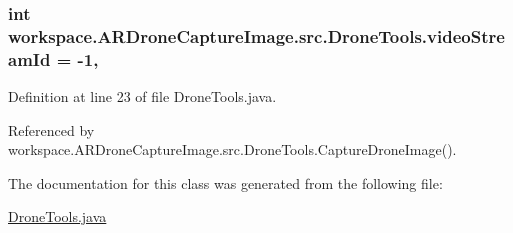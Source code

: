 \subsubsection[{video\+Stream\+Id}]{\setlength{\rightskip}{0pt plus 5cm}int workspace.\+A\+R\+Drone\+Capture\+Image.\+src.\+Drone\+Tools.\+video\+Stream\+Id = -\/1\hspace{0.3cm}{\ttfamily [static]}, {\ttfamily [private]}}\label{classworkspace_1_1_a_r_drone_capture_image_1_1src_1_1_drone_tools_a26096ea27f8535f3e07d0fd78c73933f}


Definition at line 23 of file Drone\+Tools.\+java.



Referenced by workspace.\+A\+R\+Drone\+Capture\+Image.\+src.\+Drone\+Tools.\+Capture\+Drone\+Image().



The documentation for this class was generated from the following file\+:\begin{DoxyCompactItemize}
\item 
\hyperlink{_drone_tools_8java}{Drone\+Tools.\+java}\end{DoxyCompactItemize}
